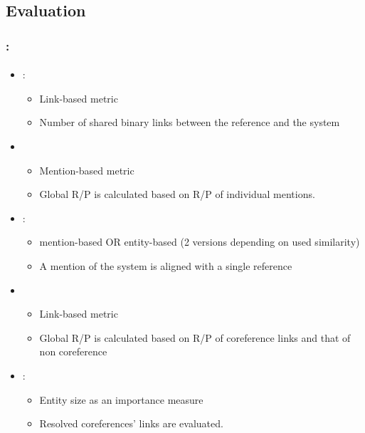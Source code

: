 \documentclass[xcolor=table]{beamer}
\begin{document}
\subsection{Evaluation}

\begin{frame}
	\frametitle{\insertshortsubtitle: \insertsection}
	\framesubtitle{\insertsubsection}
	
	\begin{itemize}
		\item {}: 
		\begin{itemize}
			\item Link-based metric
			\item Number of shared binary links between the reference and the system
		\end{itemize}
		\item {}
		\begin{itemize}
			\item Mention-based metric
			\item Global R/P is calculated based on R/P of individual mentions.
		\end{itemize}
		\item {}: 
		\begin{itemize}
			\item mention-based OR entity-based (2 versions depending on used similarity)
			\item A mention of the system is aligned with a single reference
		\end{itemize}
		\item {} 
		\begin{itemize}
			\item Link-based metric
			\item Global R/P is calculated based on R/P of coreference links and that of non coreference
		\end{itemize}
		\item {}: 
		\begin{itemize}
			\item Entity size as an importance measure
			\item Resolved coreferences' links are evaluated.
		\end{itemize}
	\end{itemize}
	
\end{frame}
\end{document}
